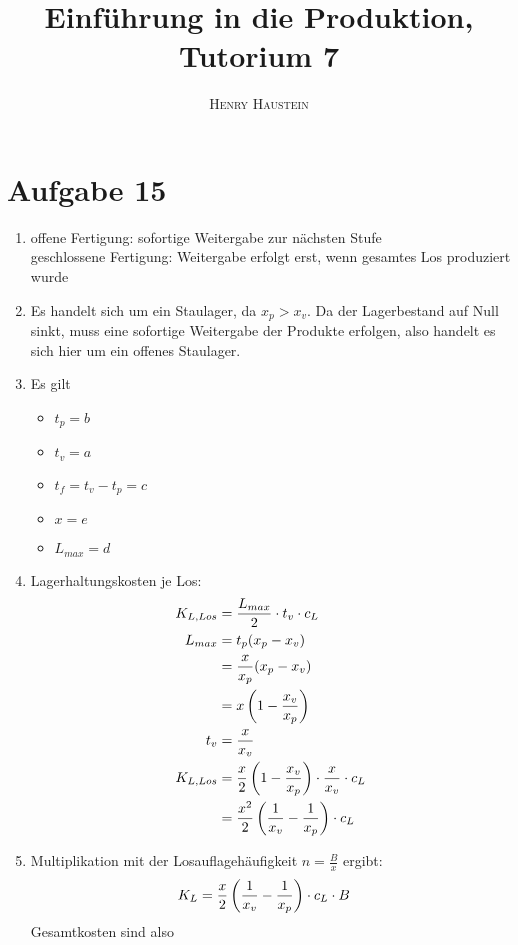 \documentclass{article}
\title{\textbf{Einführung in die Produktion, Tutorium 7}}
\author{\textsc{Henry Haustein}}
\date{}
\begin{document}
	\maketitle
	
	\section*{Aufgabe 15}
	\begin{enumerate}[label=(\alph*)]
		\item offene Fertigung: sofortige Weitergabe zur nächsten Stufe \\
		geschlossene Fertigung: Weitergabe erfolgt erst, wenn gesamtes Los produziert wurde
		\item Es handelt sich um ein Staulager, da $x_p>x_v$. Da der Lagerbestand auf Null sinkt, muss eine sofortige Weitergabe der Produkte erfolgen, also handelt es sich hier um ein offenes Staulager.
		\item Es gilt
		\begin{itemize}
			\item $t_p=b$
			\item $t_v=a$
			\item $t_f=t_v-t_p=c$
			\item $x=e$
			\item $L_{max}=d$
		\end{itemize}
		\item Lagerhaltungskosten je Los:
		\begin{align}
			K_{L,Los} &= \frac{L_{max}}{2} \cdot t_v \cdot c_L \notag \\
			L_{max} &= t_p(x_p-x_v) \notag \\
			&= \frac{x}{x_p}(x_p-x_v) \notag \\
			&= x\left(1-\frac{x_v}{x_p}\right) \notag \\
			t_v &= \frac{x}{x_v} \notag \\
			K_{L,Los} &= \frac{x}{2}\left(1-\frac{x_v}{x_p}\right) \cdot \frac{x}{x_v}\cdot c_L \notag \\
			&= \frac{x^2}{2}\left(\frac{1}{x_v}-\frac{1}{x_p}\right)\cdot c_L \notag
		\end{align}
		\item Multiplikation mit der Losauflagehäufigkeit $n=\frac{B}{x}$ ergibt:
		\begin{align}
			K_L &= \frac{x}{2}\left(\frac{1}{x_v}-\frac{1}{x_p}\right)\cdot c_L\cdot B \notag
		\end{align}
		Gesamtkosten sind also
		\begin{align}

\end{align}
\end{enumerate}
\end{document}
